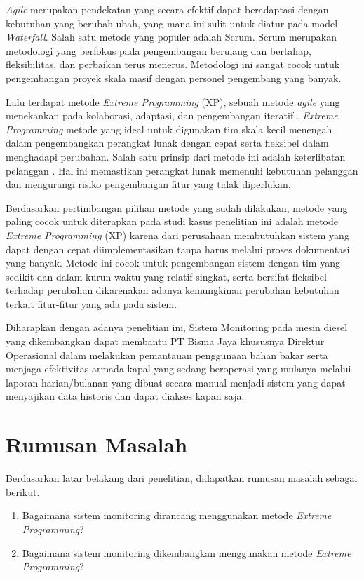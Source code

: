 \textit{Agile} merupakan pendekatan yang secara efektif dapat beradaptasi dengan kebutuhan yang berubah-ubah, yang mana ini sulit untuk diatur pada model \textit{Waterfall}. Salah satu metode yang populer adalah Scrum. Scrum merupakan metodologi yang berfokus pada pengembangan berulang dan bertahap, fleksibilitas, dan perbaikan terus menerus. Metodologi ini sangat cocok untuk pengembangan proyek skala masif dengan personel pengembang yang banyak.

Lalu terdapat metode \textit{Extreme Programming} (XP), sebuah metode \textit{agile} yang menekankan pada kolaborasi, adaptasi, dan pengembangan iteratif \parencite{article:matharu}. \textit{Extreme Programming} metode yang ideal untuk digunakan tim skala kecil menengah dalam pengembangkan perangkat lunak dengan cepat serta fleksibel dalam menghadapi perubahan. Salah satu prinsip dari metode ini adalah keterlibatan pelanggan \parencite{article:matharu}. Hal ini memastikan perangkat lunak memenuhi kebutuhan pelanggan dan mengurangi risiko pengembangan fitur yang tidak diperlukan.

Berdasarkan pertimbangan pilihan metode yang sudah dilakukan, metode yang paling cocok untuk diterapkan pada studi kasus penelitian ini adalah metode \textit{Extreme Programming} (XP) karena dari perusahaan membutuhkan sistem yang dapat dengan cepat diimplementasikan tanpa harus melalui proses dokumentasi yang banyak. Metode ini cocok untuk pengembangan sistem dengan tim yang sedikit dan dalam kurun waktu yang relatif singkat, serta bersifat fleksibel terhadap perubahan dikarenakan adanya kemungkinan perubahan kebutuhan terkait fitur-fitur yang ada pada sistem.

Diharapkan dengan adanya penelitian ini, Sistem Monitoring pada mesin diesel yang dikembangkan dapat membantu PT Bisma Jaya khususnya Direktur Operasional dalam melakukan pemantauan penggunaan bahan bakar serta menjaga efektivitas armada kapal yang sedang beroperasi yang mulanya melalui laporan harian/bulanan yang dibuat secara manual menjadi sistem yang dapat menyajikan data historis dan dapat diakses kapan saja.



\section{Rumusan Masalah}

Berdasarkan latar belakang dari penelitian, didapatkan rumusan masalah sebagai berikut.

\begin{enumerate}
    \item Bagaimana sistem monitoring dirancang menggunakan metode \textit{Extreme Programming}?
    \item Bagaimana sistem monitoring dikembangkan menggunakan metode \textit{Extreme Programming}?
\end{enumerate}

